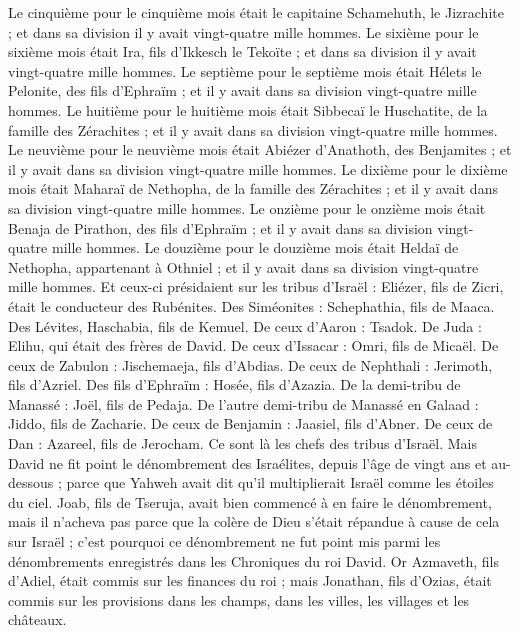 \begin{multicols}{2}
Le cinquième pour le cinquième mois était le capitaine Schamehuth, le Jizrachite ; et dans sa division il y avait vingt-quatre mille hommes.
Le sixième pour le sixième mois était Ira, fils d'Ikkesch le Tekoïte ; et dans sa division il y avait vingt-quatre mille hommes.
Le septième pour le septième mois était Hélets le Pelonite, des fils d'Ephraïm ; et il y avait dans sa division vingt-quatre mille hommes.
Le huitième pour le huitième mois était Sibbecaï le Huschatite, de la famille des Zérachites ; et il y avait dans sa division vingt-quatre mille hommes.
Le neuvième pour le neuvième mois était Abiézer d'Anathoth, des Benjamites ; et il y avait dans sa division vingt-quatre mille hommes.
Le dixième pour le dixième mois était Maharaï de Nethopha, de la famille des Zérachites ; et il y avait dans sa division vingt-quatre mille hommes.
Le onzième pour le onzième mois était Benaja de Pirathon, des fils d'Ephraïm ; et il y avait dans sa division vingt-quatre mille hommes.
Le douzième pour le douzième mois était Heldaï de Nethopha, appartenant à Othniel ; et il y avait dans sa division vingt-quatre mille hommes.
Et ceux-ci présidaient sur les tribus d'Israël : Eliézer, fils de Zicri, était le conducteur des Rubénites. Des Siméonites : Schephathia, fils de Maaca.
Des Lévites, Haschabia, fils de Kemuel. De ceux d'Aaron : Tsadok.
De Juda : Elihu, qui était des frères de David. De ceux d'Issacar : Omri, fils de Micaël.
De ceux de Zabulon : Jischemaeja, fils d'Abdias. De ceux de Nephthali : Jerimoth, fils d'Azriel.
Des fils d'Ephraïm : Hosée, fils d'Azazia. De la demi-tribu de Manassé : Joël, fils de Pedaja.
De l'autre demi-tribu de Manassé en Galaad : Jiddo, fils de Zacharie. De ceux de Benjamin : Jaasiel, fils d'Abner.
De ceux de Dan : Azareel, fils de Jerocham. Ce sont là les chefs des tribus d'Israël.
Mais David ne fit point le dénombrement des Israélites, depuis l'âge de vingt ans et au-dessous ; parce que Yahweh avait dit qu'il multiplierait Israël comme les étoiles du ciel.
Joab, fils de Tseruja, avait bien commencé à en faire le dénombrement, mais il n'acheva pas parce que la colère de Dieu s'était répandue à cause de cela sur Israël ; c'est pourquoi ce dénombrement ne fut point mis parmi les dénombrements enregistrés dans les Chroniques du roi David.
Or Azmaveth, fils d'Adiel, était commis sur les finances du roi ; mais Jonathan, fils d'Ozias, était commis sur les provisions dans les champs, dans les villes, les villages et les châteaux.

\end{multicols}
